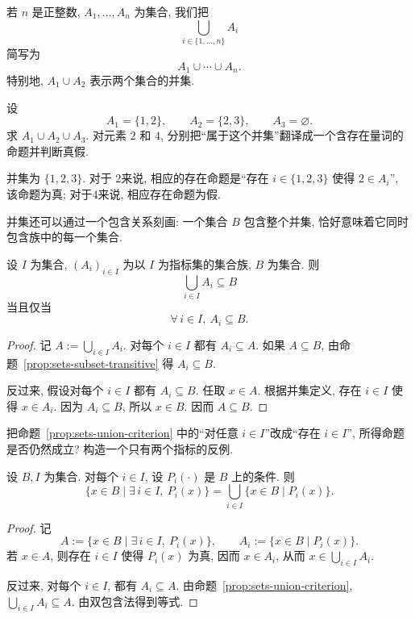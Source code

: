 \documentclass[usesamecnt, thmcnt=section, lang=cn, newtx, 10pt, scheme=chinese]{elegantbook}
\begin{document}
若 $n$ 是正整数, $A_1,\ldots,A_n$ 为集合, 我们把
\[
 \bigcup_{i\in\{1,\ldots,n\}}A_i
\]
简写为
\[
 A_1\cup\cdots\cup A_n.
\]
特别地, $A_1\cup A_2$ 表示两个集合的并集.

\begin{concept}\label{con:sets-11}
设
\[
 A_1=\{1,2\},\qquad A_2=\{2,3\},\qquad A_3=\varnothing.
\]
求 $A_1\cup A_2\cup A_3$. 对元素 $2$ 和 $4$, 分别把``属于这个并集''翻译成一个含存在量词的命题并判断真假.
\end{concept}

\begin{solution}
并集为 $\{1,2,3\}$. 对于 $2$来说, 相应的存在命题是“存在 $i\in\{1,2,3\}$ 使得 $2\in A_i$”, 该命题为真; 对于$4$来说, 相应存在命题为假.
\end{solution}


并集还可以通过一个包含关系刻画: 一个集合 $B$ 包含整个并集, 恰好意味着它同时包含族中的每一个集合.

\begin{proposition}\label{prop:sets-union-criterion}
设 $I$ 为集合, $(A_i)_{i\in I}$ 为以 $I$ 为指标集的集合族, $B$ 为集合. 则
\[
 \bigcup_{i\in I}A_i\subseteq B
\]
当且仅当
\[
 \forall\,i\in I,\ A_i\subseteq B.
\]
\end{proposition}

\begin{proof}
记 $A:=\bigcup_{i\in I}A_i$. 对每个 $i\in I$ 都有 $A_i\subseteq A$. 如果 $A\subseteq B$, 由命题~\ref{prop:sets-subset-transitive} 得 $A_i\subseteq B$.

反过来, 假设对每个 $i\in I$ 都有 $A_i\subseteq B$. 任取 $x\in A$. 根据并集定义, 存在 $i\in I$ 使得 $x\in A_i$. 因为 $A_i\subseteq B$, 所以 $x\in B$. 因而 $A\subseteq B$.
\end{proof}



\begin{exercise}\label{ex:sets-union-criterion-02}
把命题~\ref{prop:sets-union-criterion} 中的``对任意 $i\in I$''改成``存在 $i\in I$'', 所得命题是否仍然成立? 构造一个只有两个指标的反例.
\end{exercise}



\begin{corollary}\label{cor:sets-condition-union}
设 $B,I$ 为集合. 对每个 $i\in I$, 设 $P_i(\cdot)$ 是 $B$ 上的条件. 则
\[
 \{x\in B\mid \exists\,i\in I,\ P_i(x)\}
 =
 \bigcup_{i\in I}\{x\in B\mid P_i(x)\}.
\]
\end{corollary}

\begin{proof}
记
\[
 A:=\{x\in B\mid \exists\,i\in I,\ P_i(x)\},
 \qquad
 A_i:=\{x\in B\mid P_i(x)\}.
\]
若 $x\in A$, 则存在 $i\in I$ 使得 $P_i(x)$ 为真, 因而 $x\in A_i$, 从而 $x\in\bigcup_{i\in I}A_i$.

反过来, 对每个 $i\in I$, 都有 $A_i\subseteq A$. 由命题~\ref{prop:sets-union-criterion}, $\bigcup_{i\in I}A_i\subseteq A$. 由双包含法得到等式.
\end{proof}
\end{document}
